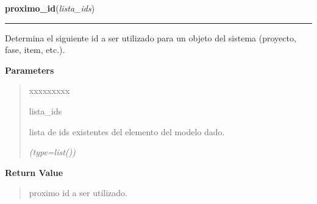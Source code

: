 \hspace{.8\funcindent}\begin{boxedminipage}{\funcwidth}

    \raggedright \textbf{proximo\_id}(\textit{lista\_ids})

    \vspace{-1.5ex}

    \rule{\textwidth}{0.5\fboxrule}
\setlength{\parskip}{2ex}
    Determina el siguiente id a ser utilizado para un objeto del sistema 
    (proyecto, fase, item, etc.).

\setlength{\parskip}{1ex}
      \textbf{Parameters}
      \vspace{-1ex}

      \begin{quote}
        \begin{Ventry}{xxxxxxxxx}

          \item[lista\_ids]

          lista de ids existentes del elemento del modelo dado.

            {\it (type=list())}

        \end{Ventry}

      \end{quote}

      \textbf{Return Value}
    \vspace{-1ex}

      \begin{quote}
      proximo id a ser utilizado.

      \end{quote}

    \end{boxedminipage}

